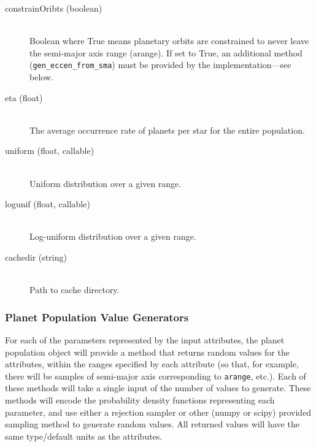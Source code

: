\documentclass[cleanfoot]{asme2ej}
\begin{document}
\begin{itemize}
\begin{description}
    \item[constrainOribts (boolean)] \hfill \\ Boolean where True means planetary orbits are constrained to never leave the semi-major axis range (arange). If set to True, an additional method (\verb+gen_eccen_from_sma+) must be provided by the implementation---see below.
    \item[eta (float)] \hfill \\ The average occurrence rate of planets per star for the entire population.
    \item[uniform (float, callable)] \hfill \\ Uniform distribution over a given range.
    \item[logunif (float, callable)] \hfill \\ Log-uniform distribution over a given range.
    \item[cachedir (string)] \hfill \\ Path to cache directory.
\end{description}
\end{itemize}

\subsubsection{Planet Population Value Generators} \label{sec:pdfs}
For each of the parameters represented by the input attributes, the planet population object will provide a method that returns random values for the attributes, within the ranges specified by each attribute (so that, for example, there will be samples of semi-major axis corresponding to \verb+arange+, etc.).  Each of these methods will take a single input of the number of values to generate.  These methods will encode the probability density functions representing each parameter, and use either a rejection sampler or other (numpy or scipy) provided sampling method to generate random values.  All returned values will have the same type/default units as the attributes. 
\end{document}
